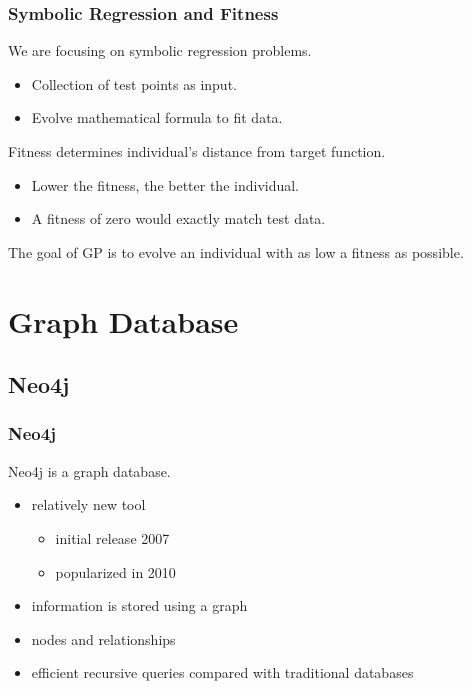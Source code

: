 \documentclass{beamer}
\newcommand{\linespace}{\vskip 0.25cm}
\begin{document}
\begin{frame}
	\frametitle{Symbolic Regression and Fitness}
	
	We are focusing on symbolic regression problems.
	\begin{itemize}
		\item Collection of test points as input.
		\item Evolve mathematical formula to fit data.
	\end{itemize}
	
	\linespace
	
	Fitness determines individual's distance from target function.
	\begin{itemize}
		\item Lower the fitness, the better the individual.
		\item A fitness of zero would exactly match test data.
	\end{itemize}
	
	\linespace 
	
	The goal of GP is to evolve an individual with as low a fitness as possible.
	
\end{frame}

\section[Graph DB]{Graph Database}
\subsection{Neo4j}

\begin{frame}
	\frametitle{Neo4j}
	
	Neo4j is a graph database.
		\begin{itemize}
		\item relatively new tool
			\begin{itemize}
			\item initial release 2007
			\item popularized in 2010
			\end{itemize}
		\item information is stored using a graph
		\item nodes and relationships
		\item efficient recursive queries compared with traditional databases
		\end{itemize}

\end{frame}
\end{document}
